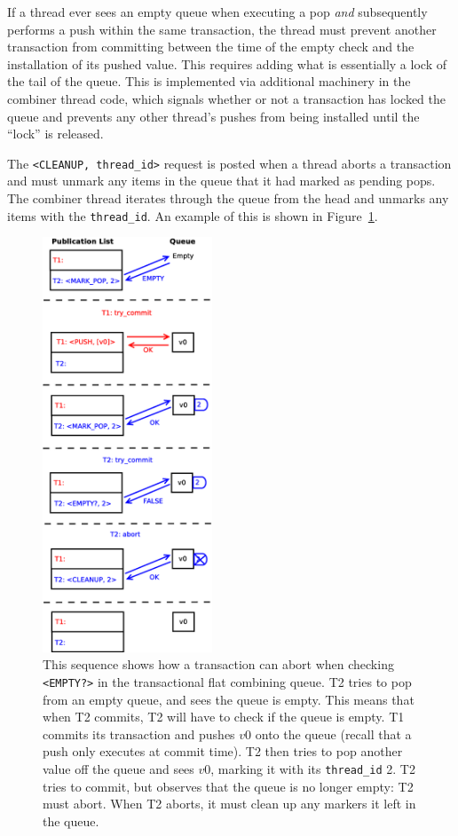 If a thread ever sees an empty queue when executing a pop \emph{and} subsequently performs a push within the same transaction, the thread must prevent another transaction from committing between the time of the empty check and the installation of its pushed value. This requires adding what is essentially a lock of the tail of the queue. This is implemented via additional machinery in the combiner thread code, which signals whether or not a transaction has locked the queue and prevents any other thread's pushes from being installed until the ``lock'' is released.

The \texttt{<CLEANUP, thread\_id>} request is posted when a thread aborts a transaction and must unmark any items in the queue that it had marked as pending pops. The combiner thread iterates through the queue from the head and unmarks any items with the \texttt{thread\_id}. An example of this is shown in Figure~\ref{fig:fcqueue_abort2}.


\begin{figure}[H]
\centering
\includegraphics[width=0.45\textwidth]{fcqueue_abort2}
    \caption[Abort and cleanup when checking the empty status of the queue]{This sequence shows how a transaction can abort when checking \texttt{<EMPTY?>} in the transactional flat combining queue. T2 tries to pop from an empty queue, and sees the queue is empty. This means that when T2 commits, T2 will have to check if the queue is empty. T1 commits its transaction and pushes $v0$ onto the queue (recall that a push only executes at commit time). T2 then tries to pop another value off the queue and sees $v0$, marking it with its \texttt{thread\_id} 2. T2 tries to commit, but observes that the queue is no longer empty: T2 must abort. When T2 aborts, it must clean up any markers it left in the queue.}
\label{fig:fcqueue_abort2}
\end{figure}


